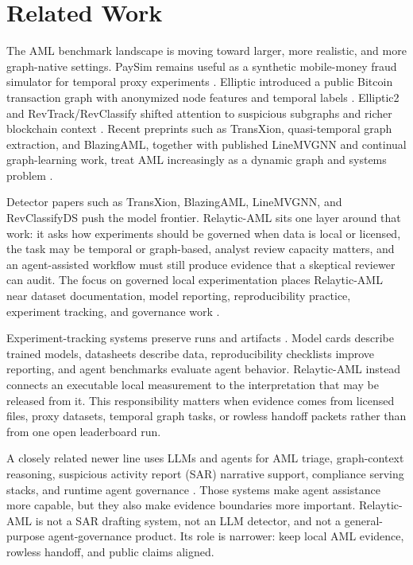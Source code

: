 \documentclass[11pt]{article}
\begin{document}
\section{Related Work}

The AML benchmark landscape is moving toward larger, more realistic, and more graph-native settings. PaySim remains useful as a synthetic mobile-money fraud simulator for temporal proxy experiments \citep{lopezrojas2016paysim}. Elliptic introduced a public Bitcoin transaction graph with anonymized node features and temporal labels \citep{weber2019elliptic}. Elliptic2 and RevTrack/RevClassify shifted attention to suspicious subgraphs and richer blockchain context \citep{bellei2024elliptic2,song2024revtrack}. Recent preprints such as TransXion, quasi-temporal graph extraction, and BlazingAML, together with published LineMVGNN and continual graph-learning work, treat AML increasingly as a dynamic graph and systems problem \citep{chen2026transxion,poon2025linemvgnn,tariq2026extraqt,ye2026blazingaml,deprez2025continualaml}.

Detector papers such as TransXion, BlazingAML, LineMVGNN, and RevClassifyDS push the model frontier. Relaytic-AML sits one layer around that work: it asks how experiments should be governed when data is local or licensed, the task may be temporal or graph-based, analyst review capacity matters, and an agent-assisted workflow must still produce evidence that a skeptical reviewer can audit. The focus on governed local experimentation places Relaytic-AML near dataset documentation, model reporting, reproducibility practice, experiment tracking, and governance work \citep{gebru2021datasheets,mitchell2019modelcards,pineau2021reproducibility,zaharia2018mlflow}.

Experiment-tracking systems preserve runs and artifacts \citep{zaharia2018mlflow}. Model cards describe trained models, datasheets describe data, reproducibility checklists improve reporting, and agent benchmarks evaluate agent behavior. Relaytic-AML instead connects an executable local measurement to the interpretation that may be released from it. This responsibility matters when evidence comes from licensed files, proxy datasets, temporal graph tasks, or rowless handoff packets rather than from one open leaderboard run.

A closely related newer line uses LLMs and agents for AML triage, graph-context reasoning, suspicious activity report (SAR) narrative support, compliance serving stacks, and runtime agent governance \citep{pirmorad2025amlgraphllm,naik2025coinvestigator,naik2026llmopsaml,gaurav2025governanceaas,kaptein2026runtimegovernance}. Those systems make agent assistance more capable, but they also make evidence boundaries more important. Relaytic-AML is not a SAR drafting system, not an LLM detector, and not a general-purpose agent-governance product. Its role is narrower: keep local AML evidence, rowless handoff, and public claims aligned.
\end{document}
